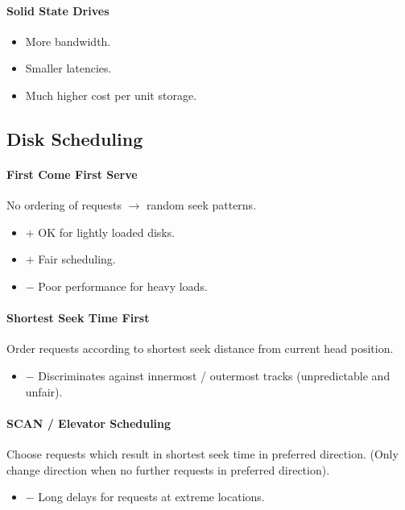 \documentclass[twocolumn,english]{article}
\begin{document}
\paragraph{Solid State Drives}
\begin{itemize}
\item More bandwidth.
\item Smaller latencies.
\item Much higher cost per unit storage.
\end{itemize}

\subsection{Disk Scheduling}

\paragraph{First Come First Serve}

No ordering of requests $\rightarrow$ random seek patterns.
\begin{itemize}
\item $+$ OK for lightly loaded disks.
\item $+$ Fair scheduling.
\item $-$ Poor performance for heavy loads.
\end{itemize}

\paragraph{Shortest Seek Time First}

Order requests according to shortest seek distance from current head
position.
\begin{itemize}
\item $-$ Discriminates against innermost / outermost tracks (unpredictable
and unfair).
\end{itemize}

\paragraph{SCAN / Elevator Scheduling}

Choose requests which result in shortest seek time in preferred direction.
(Only change direction when no further requests in preferred direction).
\begin{itemize}
\item $-$ Long delays for requests at extreme locations.
\end{itemize}
\end{document}
